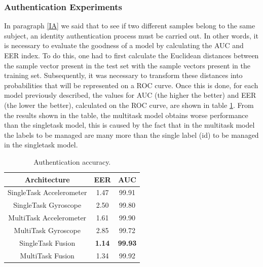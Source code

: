 \subsubsection{Authentication Experiments}
In paragraph \ref{IA} we said that to see if two different samples belong to the 
same subject, an identity authentication process must be carried out. In 
other words, it is necessary to evaluate the goodness of a model by calculating 
the AUC and EER index. To do this, one had to first calculate the 
Euclidean distances between the sample vector present in the test set with 
the sample vectors present in the training set. Subsequently, it was necessary 
to transform these distances into probabilities that will be represented 
on a ROC curve. Once this is done, for each model previously described, 
the values for AUC (the higher the better) and EER (the lower the better), 
calculated on the ROC curve, are shown in table \ref{Authentication}. From the results shown 
in the table, the multitask model obtains worse performance than the singletask 
model, this is caused by the fact that in the multitask model the labels 
to be managed are many more than the single label (id) to be managed in 
the singletask model.
\begin{table}[h!]
    \centering
    \begin{adjustbox}{max width=\textwidth}
    \begin{tabular}{|c|cc|}
        \hline
        Architecture & EER & AUC\\
        \hline
        SingleTask Accelerometer & 1.47 & 99.91\\
        SingleTask Gyroscope & 2.50 & 99.80\\
        \hline
        MultiTask Accelerometer & 1.61 & 99.90\\
        MultiTask Gyroscope & 2.85 & 99.72\\
        \hline
        SingleTask Fusion & \bfseries{1.14} & \bfseries{99.93}\\
        \hline
        MultiTask Fusion & 1.34 & 99.92\\
        \hline
    \end{tabular}
    \end{adjustbox}
    \caption{Authentication accuracy.}
    \label{Authentication}
\end{table}

